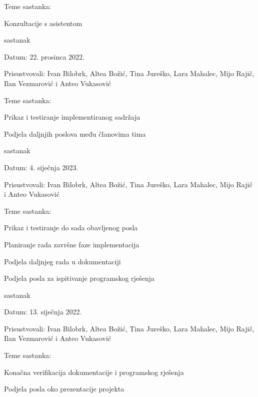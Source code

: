 \documentclass{article}
\begin{document}
\begin{packed_enum}
\begin{packed_item}
			\item Teme sastanka:
			\begin{packed_item}
				\item  Konzultacije s asistentom
			\end{packed_item}
		\end{packed_item}
		\item sastanak
	\item[] \begin{packed_item}
		\item Datum: 22. prosinca 2022. 
		\item Prisustvovali:  Ivan Bilobrk, Altea Božić, Tina Jureško, Lara Mahalec, Mijo Rajič, Ilan Vezmarović i Anteo Vukasović
		\item Teme sastanka:
		\begin{packed_item}
			\item  Prikaz i testiranje implementiranog sadržaja
			\item Podjela daljnjih poslova među članovima tima 
		\end{packed_item}
	\end{packed_item}
		\item sastanak
	\item[] \begin{packed_item}
		\item Datum: 4. siječnja 2023. 
		\item Prisustvovali:  Ivan Bilobrk, Altea Božić, Tina Jureško, Lara Mahalec, Mijo Rajič i Anteo Vukasović
		\item Teme sastanka:
		\begin{packed_item}
			\item  Prikaz i testiranje do sada obavljenog posla
			\item  Planiranje rada završne faze implementacija
			\item  Podjela daljnjeg rada u dokumentaciji
			\item  Podjela posla za ispitivanje programskog rješenja
		\end{packed_item}
	\end{packed_item}
	\eject
		\item sastanak
	\item[] \begin{packed_item}
		\item Datum: 13. siječnja 2022. 
		\item Prisustvovali:  Ivan Bilobrk, Altea Božić, Tina Jureško, Lara Mahalec, Mijo Rajič, Ilan Vezmarović i Anteo Vukasović
		\item Teme sastanka:
		\begin{packed_item}
			\item  Konačna verifikacija dokumentacije i programskog rješenja
			\item  Podjela posla oko prezentacije projekta
		\end{packed_item}
	\end{packed_item}
	\end{packed_enum}
	\eject
\end{document}
